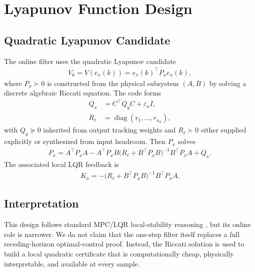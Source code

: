 \documentclass[11pt]{article}
\begin{document}
\section{Lyapunov Function Design}
\subsection{Quadratic Lyapunov Candidate}
The online filter uses the quadratic Lyapunov candidate
\begin{align}
V_k = V(e_x(k)) = e_x(k)^\top P_x e_x(k), \label{eq:V_def}
\end{align}
where $P_x \succ 0$ is constructed from the physical subsystem $(A,B)$ by solving a discrete algebraic Riccati equation. The code forms
\begin{align}
Q_x &= C^\top Q_y C + \varepsilon_x I, \label{eq:Qx_def}\\
R_\ell &= \operatorname{diag}(r_1,\dots,r_{n_u}), \label{eq:Rl_def}
\end{align}
with $Q_y \succeq 0$ inherited from output tracking weights and $R_\ell \succ 0$ either supplied explicitly or synthesized from input headroom. Then $P_x$ solves
\begin{align}
P_x
= A^\top P_x A
- A^\top P_x B \big(R_\ell + B^\top P_x B\big)^{-1} B^\top P_x A
+ Q_x. \label{eq:dare}
\end{align}
The associated local LQR feedback is
\begin{align}
K_x = -\big(R_\ell + B^\top P_x B\big)^{-1} B^\top P_x A. \label{eq:lqr_gain}
\end{align}

\subsection{Interpretation}
This design follows standard MPC/LQR local-stability reasoning \cite{mayne2000,rawlings2017}, but its online role is narrower. We do not claim that the one-step filter itself replaces a full receding-horizon optimal-control proof. Instead, the Riccati solution is used to build a local quadratic certificate that is computationally cheap, physically interpretable, and available at every sample.
\end{document}
